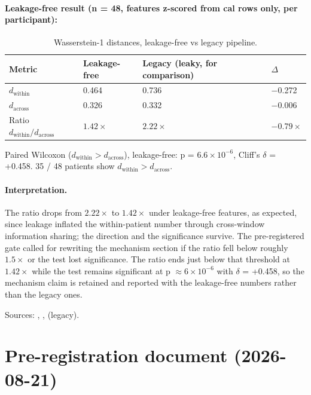 \documentclass{article}
\begin{document}
\paragraph{Leakage-free result (n = 48, features z-scored from cal rows only, per participant):}

\begin{table}[h]
  \caption{Wasserstein-1 distances, leakage-free vs legacy pipeline.}
  \label{tab:wasserstein}
  \centering
  \small
  \begin{tabular}{llll}
    \toprule
    Metric & Leakage-free & Legacy (leaky, for comparison) & $\Delta$ \\
    \midrule
    $d_{\mathrm{within}}$ & 0.464 & 0.736 & $-$0.272 \\
    $d_{\mathrm{across}}$ & 0.326 & 0.332 & $-$0.006 \\
    Ratio $d_{\mathrm{within}} / d_{\mathrm{across}}$ & $1.42\times$ & $2.22\times$ & $-0.79\times$ \\
    \bottomrule
  \end{tabular}
\end{table}

Paired Wilcoxon ($d_{\mathrm{within}} > d_{\mathrm{across}}$), leakage-free: p = $6.6 \times 10^{-6}$, Cliff's $\delta$ = +0.458. 35 / 48 patients show $d_{\mathrm{within}} > d_{\mathrm{across}}$.

\paragraph{Interpretation.} The ratio drops from $2.22\times$ to $1.42\times$ under leakage-free features, as expected, since leakage inflated the within-patient number through cross-window information sharing; the direction and the significance survive. The pre-registered gate called for rewriting the mechanism section if the ratio fell below roughly $1.5\times$ or the test lost significance. The ratio ends just below that threshold at $1.42\times$ while the test remains significant at p $\approx 6 \times 10^{-6}$ with $\delta$ = +0.458, so the mechanism claim is retained and reported with the leakage-free numbers rather than the legacy ones.

Sources: , ,  (legacy).

\section{Pre-registration document (2026-08-21)}
\label{app:prereg}
\end{document}
